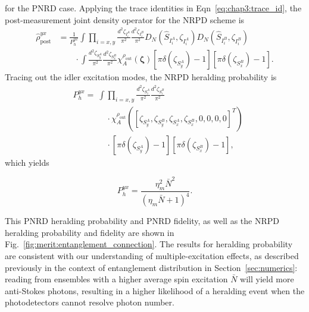 \documentclass[aps,twocolumn,secnumarabic,amsmath,amssymb,pra,groupedaddress,
showpacs, showkeys]{revtex4-1}
\newcommand{\pna}[1]{\left(#1\right)}
\newcommand{\pnb}[1]{\left[#1\right]}
\newcommand{\eqn}[1]{
\begin{equation}
	#1
\end{equation}
}
\begin{document}
for the PNRD case. Applying the trace identities in
Eqn~\ref{eq:chap3:trace_id}, the post-measurement joint density operator for
the NRPD scheme is
\begin{align}
\hat{\rho}_{\textrm{post}}^{yx}& =
\frac{1}{P_{h}^{yx}}\int \prod_{i=x,y}
\frac{d^2 \zeta_{I_i^A}}{\pi^2} 
\frac{d^2 \zeta_{I_i^B}}{\pi^2} 
D_N\pna{\hat{S}_{I_i^A},\zeta_{I_i^A}} 
D_N\pna{\hat{S}_{I_i^B},\zeta_{I_i^B}}  \nonumber \\
& \qquad \cdot \int 
\frac{d^2 \zeta_{S_y^A}}{\pi^2} 
\frac{d^2 \zeta_{S_x^B}}{\pi^2}
\chi_A^{\rho_{\textrm{out}}}\pna{\bm{\zeta}} 
\pnb{\pi\delta\pna{\zeta_{S_y^A}}-1}\pnb{\pi\delta\pna{\zeta_{S_x^B}}-1}.
\end{align}
Tracing out the idler excitation modes, the NRPD heralding probability is 
\begin{align}
& P_{h}^{yx} = \nonumber \ \int 
\prod_{i=x,y}
\frac{d^2 \zeta_{S_i^A}}{\pi^2} 
\frac{d^2 \zeta_{S_i^B}}{\pi^2} \nonumber \\ 
& \qquad \qquad \cdot
\chi_A^{\rho_{\textrm{out}}}\pna{\pnb{\zeta_{S_y^A},\zeta_{S_y^B},\zeta_{S_x^A},\zeta_{S_x^B},0,0,0,0}^T}
\nonumber \\
& \qquad \qquad \cdot 
\pnb{\pi\delta\pna{\zeta_{S_y^A}}-1}\pnb{\pi\delta\pna{\zeta_{S_x^B}}-1},
\end{align}
which yields
\eqn{
P_{h}^{yx} = \frac{\eta ^2_{m} \bar{N}^2}{(\eta_{m}  \bar{N}+1)^4}.
}
This PNRD heralding probability and PNRD fidelity, as well as the NRPD
heralding probability and fidelity are shown in
Fig.~\ref{fig:merit:entanglement_connection}. The results for heralding
probability are consistent with our understanding of multiple-excitation
effects, as described previously in the context of entanglement distribution in
Section~\ref{sec:numerics}: reading from ensembles with a higher average spin
excitation $\bar{N}$ will yield more anti-Stokes photons, resulting in a higher
likelihood of a heralding event when the photodetectors cannot resolve photon
number.
\end{document}
